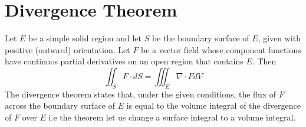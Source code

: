\documentclass[10pt, twocolumn]{thesis}
\begin{document}
\section{Divergence Theorem}
Let $E$ be a simple solid region and let $S$ be the boundary surface of $E$, given with positive (outward) orientation. Let $F$ be a vector field whose component functions have continuos partial derivatives on an open region that contains $E$. Then
\[\iint_{S}F\cdot dS = \iiint_{E}\nabla\cdot FdV\]
The divergence theorem states that, under the given conditions, the flux of $F$ across the boundary surface of $E$ is equal to the volume integral of the divergence of $F$ over $E$ i.e the theorem let us change a surface integral to a volume integral.


\end{document}
